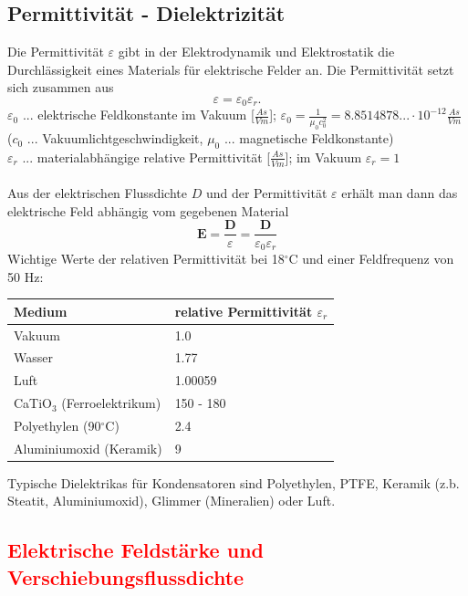 		\subsection{Permittivität - Dielektrizität}
			Die Permittivität $ \varepsilon $ gibt in der Elektrodynamik und Elektrostatik die Durchlässigkeit eines Materials für elektrische Felder an. Die Permittivität setzt sich zusammen aus
			\[\varepsilon = \varepsilon_{0}\varepsilon_{r}. \]
			\leavevmode
			\tab[1cm] \textbf{$ \varepsilon_{0} $} \tab ... \tab elektrische Feldkonstante im Vakuum [$ \frac{As}{Vm} $]; $ \varepsilon_{0}=\frac{1}{\mu_{0}c_{0}^{2}}=8.8514878...\cdot10^{-12}\frac{As}{Vm} $ \\\tab[2.5cm]($ c_{0}$ ... Vakuumlichtgeschwindigkeit, $ \mu_{0} $ ... magnetische Feldkonstante)\\
			\tab[1cm] \textbf{$ \varepsilon_{r} $} \tab ... \tab materialabhängige relative Permittivität [$ \frac{As}{Vm} $]; im Vakuum $ \varepsilon_{r}=1 $\\\\
			Aus der elektrischen Flussdichte $ D $ und der Permittivität $ \varepsilon $ erhält man dann das elektrische Feld abhängig vom gegebenen Material
			\[\bm{E}=\frac{\bm{D}}{\varepsilon}=\frac{\bm{D}}{\varepsilon_{0}\varepsilon_{r}}\]
			Wichtige Werte der relativen Permittivität bei 18$^{\circ}$C und einer Feldfrequenz von 50 Hz:\\
			\begin{center}
				\begin{tabular}{l|l}
					\textbf{Medium} & relative Permittivität $ \varepsilon_{r} $ \\\hline
					Vakuum & 1.0\\
					Wasser & 1.77\\
					Luft & 1.00059\\
					CaTiO$ _{3} $ (Ferroelektrikum) & 150 - 180\\
					Polyethylen (90$^{\circ}$C) & 2.4\\
					Aluminiumoxid (Keramik) & 9
					
				
				\end{tabular}
			\end{center}
			Typische Dielektrikas für Kondensatoren sind Polyethylen, PTFE, Keramik (z.b. Steatit, Aluminiumoxid), Glimmer (Mineralien) oder Luft.
		\subsection{\textcolor{red}{Elektrische Feldstärke und Verschiebungsflussdichte}}
